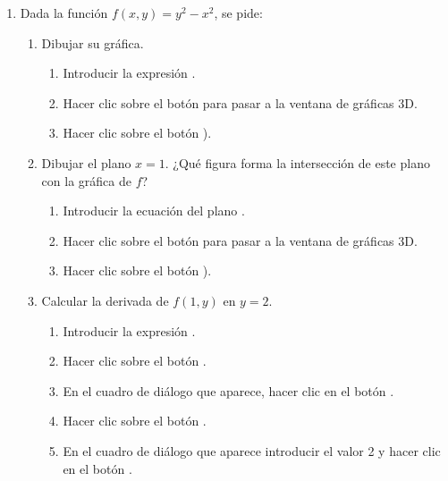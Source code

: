 \begin{enumerate}[leftmargin=*]
\item Dada la función $f(x,y)=y^2-x^2$, se pide:
\begin{enumerate}
\item Dibujar su gráfica. 
\begin{indication}
\begin{enumerate}
\item Introducir la expresión .
\item Hacer clic sobre el botón  para pasar a la ventana de gráficas 3D.
\item Hacer clic sobre el botón ).
\end{enumerate}
\end{indication}


\item Dibujar el plano $x=1$. ¿Qué figura forma la intersección de este plano con la gráfica de $f$?
\begin{indication}
\begin{enumerate}
\item Introducir la ecuación del plano .
\item Hacer clic sobre el botón  para pasar a la ventana de gráficas 3D.
\item Hacer clic sobre el botón ).
\end{enumerate}
\end{indication}

\item Calcular la derivada de $f(1,y)$ en $y=2$.
\begin{indication}
\begin{enumerate}
\item Introducir la expresión .
\item Hacer clic sobre el botón .
\item En el cuadro de diálogo que aparece, hacer clic en el botón .
\item Hacer clic sobre el botón .
\item En el cuadro de diálogo que aparece introducir el valor 2 y hacer clic en el botón .
\end{enumerate}
\end{indication}


\end{enumerate}
\end{enumerate}
